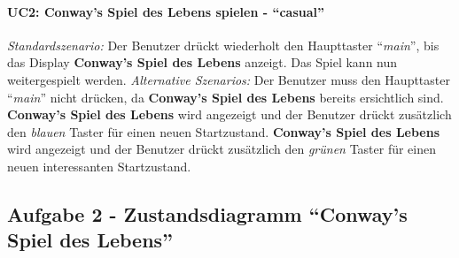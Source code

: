 \documentclass[11pt,ngerman]{article}
\newcommand{\quotes}[1]{``#1''}
\begin{document}
    \paragraph{UC2: Conway's Spiel des Lebens spielen - \quotes{casual}}
    \label{p:UC2Spielspielen}
    \begin{tcolorbox}[enhanced, breakable, sharp corners, width=\dimexpr\textwidth-15mm\relax ,enlarge left by=10mm ,fontupper=\linespread{1.1}\selectfont, boxrule=1pt, title={UC2: Conway's Spiel des Lebens spielen}, colback=white, colframe=gray!22, coltitle=black]
        \textit{Standardszenario:} \newline
        Der Benutzer drückt wiederholt den Haupttaster \quotes{\textit{main}}, bis das Display \textbf{Conway's Spiel des Lebens} anzeigt. Das Spiel kann nun weitergespielt werden.\newline
        \newline
        \textit{Alternative Szenarios:} \newline
        Der Benutzer muss den Haupttaster \quotes{\textit{main}} nicht drücken, da \textbf{Conway's Spiel des Lebens} bereits ersichtlich sind. \newline
        \newline
        \textbf{Conway's Spiel des Lebens} wird angezeigt und der Benutzer drückt zusätzlich den \textit{blauen} Taster für einen neuen Startzustand. \newline
         \newline
         \textbf{Conway's Spiel des Lebens} wird angezeigt und der Benutzer drückt zusätzlich den \textit{grünen} Taster für einen neuen interessanten Startzustand. \newline\newline
    \end{tcolorbox}

    \subsection{Aufgabe 2 - Zustandsdiagramm \quotes{Conway's Spiel des Lebens}}
    \label{ssec:Aufg2}
\end{document}
